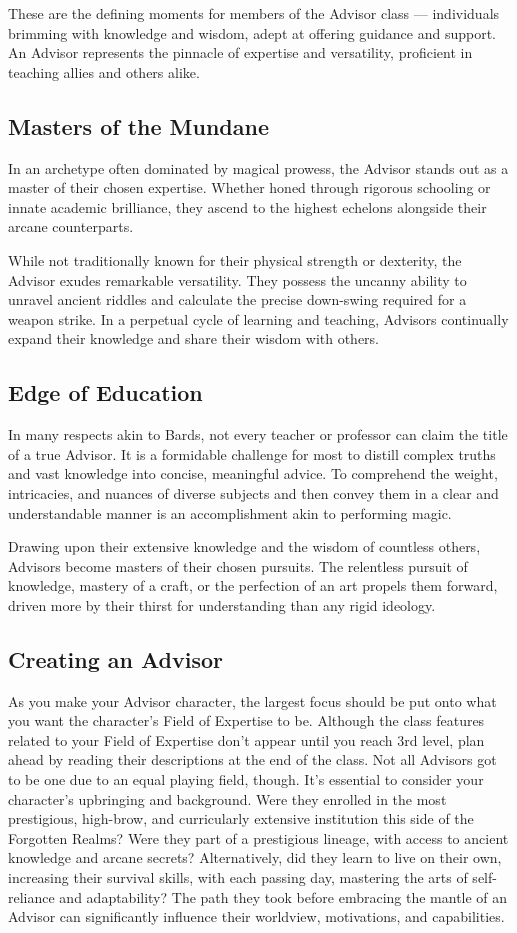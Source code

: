 \documentclass[letterpaper,openany,twoside,twocolumn]{book}
\begin{document}
	These are the defining moments for members of the Advisor class — individuals brimming with knowledge and wisdom, adept at offering guidance and support. An Advisor represents the pinnacle of expertise and versatility, proficient in teaching allies and others alike.
	\subsection{Masters of the Mundane}
	In an archetype often dominated by magical prowess, the Advisor stands out as a master of their chosen expertise. Whether honed through rigorous schooling or innate academic brilliance, they ascend to the highest echelons alongside their arcane counterparts.

	While not traditionally known for their physical strength or dexterity, the Advisor exudes remarkable versatility. They possess the uncanny ability to unravel ancient riddles and calculate the precise down-swing required for a weapon strike. In a perpetual cycle of learning and teaching, Advisors continually expand their knowledge and share their wisdom with others.
	\subsection{Edge of Education}
	In many respects akin to Bards, not every teacher or professor can claim the title of a true Advisor. It is a formidable challenge for most to distill complex truths and vast knowledge into concise, meaningful advice. To comprehend the weight, intricacies, and nuances of diverse subjects and then convey them in a clear and understandable manner is an accomplishment akin to performing magic.

	Drawing upon their extensive knowledge and the wisdom of countless others, Advisors become masters of their chosen pursuits. The relentless pursuit of knowledge, mastery of a craft, or the perfection of an art propels them forward, driven more by their thirst for understanding than any rigid ideology.
	\vfill\eject
	\vspace*{20cm}
	\subsection{Creating an Advisor}
	As you make your Advisor character, the largest focus should be put onto what you want the character's Field of Expertise to be. Although the class features related to your Field of Expertise don't appear until you reach 3rd level, plan ahead by reading their descriptions at the end of the class.
	\clearpage
	\noindent Not all Advisors got to be one due to an equal playing field, though. It's essential to consider your character's upbringing and background. Were they enrolled in the most prestigious, high-brow, and curricularly extensive institution this side of the Forgotten Realms? Were they part of a prestigious lineage, with access to ancient knowledge and arcane secrets? Alternatively, did they learn to live on their own, increasing their survival skills, with each passing day, mastering the arts of self-reliance and adaptability? The path they took before embracing the mantle of an Advisor can significantly influence their worldview, motivations, and capabilities.
	
\end{document}
